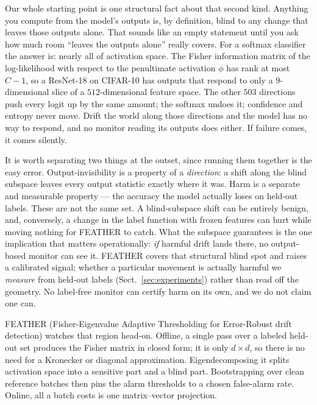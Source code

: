 \documentclass[acmsmall,screen]{acmart}
\theoremstyle{acmdefinition}
\newcommand{\act}{\phi}
\begin{document}
Our whole starting point is one structural fact about that second kind.
Anything you compute from the model's outputs is, by definition, blind to any
change that leaves those outputs alone. That sounds like an empty statement
until you ask how much room ``leaves the outputs alone'' really covers. For a
softmax classifier the answer is: nearly all of activation space. The Fisher
information matrix of the log-likelihood with respect to the penultimate
activation $\act$ has rank at most $C-1$, so a ResNet-18 on CIFAR-10 has
outputs that respond to only a $9$-dimensional slice of a $512$-dimensional
feature space. The other $503$ directions push every logit up by the same
amount; the softmax undoes it; confidence and entropy never move. Drift the
world along those directions and the model has no way to respond, and no
monitor reading its outputs does either. If failure comes, it comes silently.

It is worth separating two things at the outset, since running them together is
the easy error. Output-invisibility is a property of a \emph{direction}: a shift
along the blind subspace leaves every output statistic exactly where it was.
Harm is a separate and measurable property --- the accuracy the model actually
loses on held-out labels. These are not the same set. A blind-subspace shift can
be entirely benign, and, conversely, a change in the label function with frozen
features can hurt while moving nothing for FEATHER to catch. What the subspace
guarantees is the one implication that matters operationally: \emph{if} harmful
drift lands there, no output-based monitor can see it. FEATHER covers that
structural blind spot and raises a calibrated signal; whether a particular
movement is actually harmful we \emph{measure} from held-out labels
(Sect.~\ref{sec:experiments}) rather than read off the geometry. No label-free
monitor can certify harm on its own, and we do not claim one can.

FEATHER (Fisher-Eigenvalue Adaptive Thresholding for Error-Robust drift
detection) watches that region head-on. Offline, a single pass over a labeled
held-out set produces the Fisher matrix in closed form; it is only
$d \times d$, so there is no need for a Kronecker or diagonal approximation.
Eigendecomposing it splits activation space into a sensitive part and a blind
part. Bootstrapping over clean reference batches then pins the alarm
thresholds to a chosen false-alarm rate. Online, all a batch costs is one
matrix--vector projection.
\end{document}
